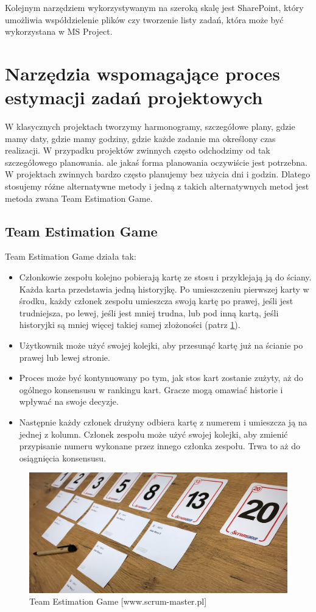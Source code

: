 Kolejnym narzędziem wykorzystywanym na szeroką skalę jest SharePoint,
który umożliwia współdzielenie plików czy tworzenie listy zadań,
która może być wykorzystana w MS Project.

\section{Narzędzia wspomagające proces estymacji zadań projektowych}

W klasycznych projektach tworzymy harmonogramy, szczegółowe plany, gdzie mamy daty,
gdzie mamy godziny, gdzie każde zadanie ma określony czas realizacji.
W przypadku projektów zwinnych często odchodzimy od tak szczegółowego planowania.
ale jakaś forma planowania oczywiście jest potrzebna.
W projektach zwinnych bardzo często planujemy bez użycia dni i godzin.
Dlatego stosujemy różne alternatywne metody i jedną z takich alternatywnych metod
jest metoda zwana Team Estimation Game.

\subsection{Team Estimation Game}

Team Estimation Game działa tak:

\begin{itemize}
	\item Członkowie zespołu kolejno pobierają kartę ze stosu i przyklejają ją do ściany.
	Każda karta przedstawia jedną historyjkę.
	Po umieszczeniu pierwszej karty w środku, każdy członek zespołu umieszcza swoją kartę po prawej,
	jeśli jest trudniejsza, po lewej, jeśli jest mniej trudna,
	lub pod inną kartą, jeśli historyjki są mniej więcej takiej samej złożoności
	(patrz \ref{rys:teamEstimationGame}).
	\item Użytkownik może użyć swojej kolejki, aby przesunąć kartę już na ścianie po prawej lub lewej stronie.
	\item Proces może być kontynuowany po tym, jak stos kart zostanie zużyty,
	aż do ogólnego konsensusu w rankingu kart. Gracze mogą omawiać historie i wpływać na swoje decyzje.
	\item Następnie każdy członek drużyny odbiera kartę z numerem i umieszcza ją na jednej z kolumn.
	Członek zespołu może użyć swojej kolejki, aby zmienić przypisanie numeru
	wykonane przez innego członka zespołu. Trwa to aż do osiągnięcia konsensusu.
\end{itemize}

\begin{figure}
	\centering\includegraphics[width=.4\textwidth]{img/team_estimation_game}
	\caption{Team Estimation Game [www.scrum-master.pl]}
	\label{rys:teamEstimationGame}
\end{figure}

